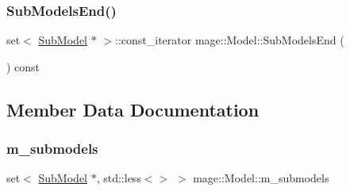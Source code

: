 \hypertarget{classmage_1_1_model_a855e215577321ff6e226c624d7bd7e39}{}\label{classmage_1_1_model_a855e215577321ff6e226c624d7bd7e39} 
\subsubsection{\texorpdfstring{Sub\+Models\+End()}{SubModelsEnd()}\hspace{0.1cm}{\footnotesize\ttfamily [2/2]}}
{\footnotesize\ttfamily set$<$ \hyperlink{classmage_1_1_sub_model}{Sub\+Model} $\ast$ $>$\+::const\+\_\+iterator mage\+::\+Model\+::\+Sub\+Models\+End (\begin{DoxyParamCaption}{ }\end{DoxyParamCaption}) const}



\subsection{Member Data Documentation}
\hypertarget{classmage_1_1_model_a86c68c03650c206afa9c0a0b09a849e3}{}\label{classmage_1_1_model_a86c68c03650c206afa9c0a0b09a849e3} 
\subsubsection{\texorpdfstring{m\+\_\+submodels}{m\_submodels}}
{\footnotesize\ttfamily set$<$ \hyperlink{classmage_1_1_sub_model}{Sub\+Model} $\ast$, std\+::less$<$$>$ $>$ mage\+::\+Model\+::m\+\_\+submodels\hspace{0.3cm}{\ttfamily [private]}}

